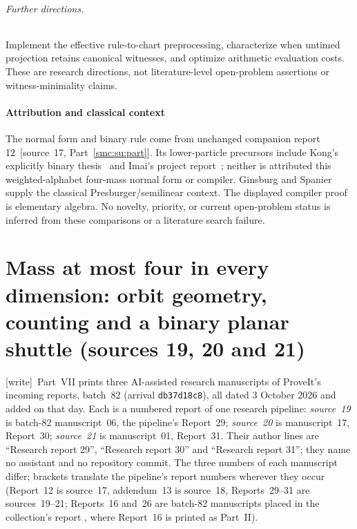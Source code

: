 \documentclass[11pt,letterpaper]{article}
\numberwithin{equation}{section}
\theoremstyle{definition}
\theoremstyle{remark}
\newcommand{\wtag}{\textup{[write]}}
\begin{document}
\paragraph{Further directions.}\label{smc:tq:q:directions}
Implement the effective rule-to-chart preprocessing, characterize when
untimed projection retains canonical witnesses, and optimize arithmetic
evaluation costs. These are research directions, not literature-level
open-problem assertions or witness-minimality claims.

\subsection{Attribution and classical context}\label{smc:tq:sec:attribution}
The normal form and binary rule come from unchanged companion report
12~\textup{[source~17, Part~\ref{smc:su:part}]}. Its lower-particle precursors include Kong's explicitly
binary thesis~\cite{kongthesis} and Imai's project report~\cite{kakenfinal}; neither is
attributed this weighted-alphabet four-mass normal form or compiler.
Ginsburg and Spanier~\cite{ginsburgspanier} supply the classical
Presburger/semilinear context. The displayed compiler proof is elementary
algebra. No novelty, priority, or current open-problem status is inferred
from these comparisons or a literature search failure.


\part{Mass at most four in every dimension: orbit geometry, counting and a binary planar shuttle (sources 19, 20 and 21)}\label{smc:zd:part}

\noindent\wtag\ Part~VII prints three AI-assisted research manuscripts of ProveIt's incoming reports, batch~82 (arrival \texttt{db37d18c8}), all dated 3 October 2026 and added on that day. Each is a numbered report of one research pipeline: \emph{source~19} is batch-82 manuscript~06, the pipeline's Report~29; \emph{source~20} is manuscript~17, Report~30; \emph{source~21} is manuscript~01, Report~31. Their author lines are ``Research report 29'', ``Research report 30'' and ``Research report 31''; they name no assistant and no repository commit. The three numbers of each manuscript differ; brackets translate the pipeline's report numbers wherever they occur (Report~12 is source~17, addendum~13 is source~18, Reports~29--31 are sources~19--21; Reports~16 and~26 are batch-82 manuscripts placed in the collection's report , where Report~16 is printed as Part~II).
\end{document}

